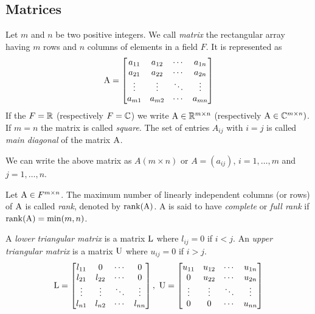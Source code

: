\subsection{Matrices}

\begin{definition}
    Let $m$ and $n$ be two positive integers. We call \textit{matrix} the rectangular array having $m$ rows and $n$ columns of elements in a field $F$. It is represented as
    $$
        \mathrm{A} = \left[\begin{matrix}
        a_{11} & a_{12} & \cdots & a_{1n} \\
        a_{21} & a_{22} & \cdots & a_{2n} \\
        \vdots & \vdots & \ddots & \vdots \\
        a_{m1} & a_{m2} & \cdots & a_{mn}
        \end{matrix}\right]
    $$
    If the $F = \mathbb{R}$ (respectively $F = \mathbb{C}$) we write $\mathrm{A} \in \mathbb{R}^{m \times n}$ (respectively $\mathrm{A} \in \mathbb{C}^{m \times n})$. If $m = n$ the matrix is called \textit{square}. The set of entries $A_{ij}$ with $i = j$ is called \textit{main diagonal} of the matrix $\mathrm{A}$.
\end{definition}

We can write the above matrix as $A(m \times n)$ or $A = (a_{ij})$, $i = 1, \hdots, m$ and $j = 1, \hdots, n$.

\begin{definition}
    Let $\mathrm{A} \in F^{m \times n}$. The maximum number of linearly independent columns (or rows) of $\mathrm{A}$ is called \textit{rank}, denoted by $\mathrm{rank}(\mathrm{A})$. A is said to have \textit{complete} or \textit{full rank} if $\mathrm{rank}(\mathrm{A}) = \min(m, n)$.
\end{definition}

\begin{definition}
    A \textit{lower triangular matrix} is a  matrix $\mathrm{L}$ where $l_{ij} = 0$ if $i < j$. An \textit{upper triangular matrix} is a  matrix $\mathrm{U}$ where $u_{ij} = 0$ if $i > j$.
    $$
        \mathrm{L} = \left[\begin{matrix}
        l_{11} & 0 & \cdots & 0 \\
        l_{21} & l_{22} & \cdots & 0 \\
        \vdots & \vdots & \ddots & \vdots \\
        l_{n1} & l_{n2} & \cdots & l_{nn}
        \end{matrix}\right],\  
        \mathrm{U} = \left[\begin{matrix}
        u_{11} & u_{12} & \cdots & u_{1n} \\
        0 & u_{22} & \cdots & u_{2n} \\
        \vdots & \vdots & \ddots & \vdots \\
        0 & 0 & \cdots & u_{nn}
        \end{matrix}\right]
    $$
\end{definition}

